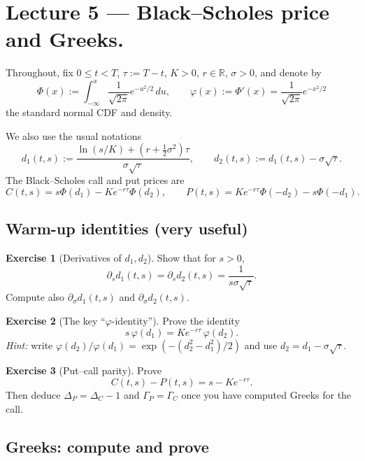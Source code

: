 \documentclass[11pt]{article}
\newcommand{\R}{\mathbb{R}}
\newcommand{\1}{\mathbf{1}}
\theoremstyle{definition}
\newtheorem{exercise}{Exercise}[section]
\begin{document}
\section{Lecture 5 --- Black--Scholes price and Greeks.}


Throughout, fix $0\le t<T$, $\tau:=T-t$, $K>0$, $r\in\R$, $\sigma>0$, and denote by
$$
\Phi(x):=\int_{-\infty}^x \frac{1}{\sqrt{2\pi}}e^{-u^2/2}\,du,
\qquad
\varphi(x):=\Phi'(x)=\frac{1}{\sqrt{2\pi}}e^{-x^2/2}
$$
the standard normal CDF and density.

We also use the usual notations
$$
d_1(t,s):=\frac{\ln(s/K)+(r+\frac12\sigma^2)\tau}{\sigma\sqrt{\tau}},
\qquad
d_2(t,s):=d_1(t,s)-\sigma\sqrt{\tau}.
$$
The Black--Scholes call and put prices are
$$
C(t,s)=s\Phi(d_1)-K e^{-r\tau}\Phi(d_2),
\qquad
P(t,s)=K e^{-r\tau}\Phi(-d_2)-s\Phi(-d_1).
$$

\subsection*{Warm-up identities (very useful)}

\begin{exercise}[Derivatives of $d_1,d_2$]
Show that for $s>0$,
$$
\partial_s d_1(t,s)=\partial_s d_2(t,s)=\frac{1}{s\sigma\sqrt{\tau}}.
$$
Compute also $\partial_\sigma d_1(t,s)$ and $\partial_\sigma d_2(t,s)$.
\end{exercise}

\begin{exercise}[The key ``$\varphi$-identity'']
Prove the identity
\begin{equation}\label{eq:phi-identity-exo}
s\,\varphi(d_1)=K e^{-r\tau}\,\varphi(d_2).
\end{equation}
\emph{Hint:} write $\varphi(d_2)/\varphi(d_1)=\exp(-(d_2^2-d_1^2)/2)$ and use
$d_2=d_1-\sigma\sqrt{\tau}$.
\end{exercise}

\begin{exercise}[Put--call parity]
Prove
$$
C(t,s)-P(t,s)=s-K e^{-r\tau}.
$$
Then deduce $\Delta_P=\Delta_C-1$ and $\Gamma_P=\Gamma_C$ once you have computed Greeks for the call.
\end{exercise}

\subsection*{Greeks: compute and prove}
\end{document}
